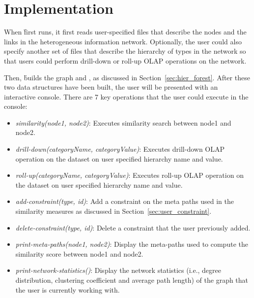 \section{Implementation}
\label{sec:impl}

When \h first runs, it first reads user-specified files that describe the nodes
and the links in the heterogeneous information network.  Optionally, the user
could also specify another set of files that describe the hierarchy of types in
the network so that users could perform drill-down or roll-up OLAP operations
on the network.

Then, \h builds the graph and \hTable, as discussed in
Section~\ref{sec:hier_forest}.  After these two data structures have been
built, the user will be presented with an interactive console. There are 7 key
operations that the user could execute in the console:

\begin{itemize}

    \item \textit{similarity(node1, node2)}: Executes similarity search between
    node1 and node2.

    \item \textit{drill-down(categoryName, categoryValue)}: Executes drill-down
    OLAP operation on the dataset on user specified hierarchy name and value.

    \item \textit{roll-up(categoryName, categoryValue)}: Executes roll-up OLAP
    operation on the dataset on user specified hierarchy name and value.

    \item \textit{add-constraint(type, id)}: Add a constraint on the meta paths
    used in the similarity measures as discussed in
    Section~\ref{sec:user_constraint}.

    \item \textit{delete-constraint(type, id)}: Delete a constraint that the
    user previously added.

    \item \textit{print-meta-paths(node1, node2)}: Display the meta-paths used
    to compute the similarity score between node1 and node2.

    \item \textit{print-network-statistics()}: Display the network statistics
    (i.e., degree distribution, clustering coefficient and average path length)
    of the graph that the user is currently working with.

\end{itemize}
